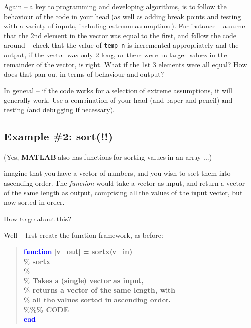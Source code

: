 \documentclass{tufte-book} %
\newenvironment{docspecbold}{\begin{quotation}\ttfamily\bfseries\parskip0pt\parindent0pt\ignorespaces}{\end{quotation}}
\begin{document}
Again -- a key to programming and developing algorithms, is to follow the behaviour of the code in your head (as well as adding break points and testing with a variety of inputs, including extreme assumptions). For instance -- assume that the 2nd element in the vector was equal to the first, and follow the code around -- check that the value of \texttt{temp\_n} is incremented appropriately and the output, if the vector was only 2 long, or there were no larger values in the remainder of the vector, is right. What if the 1st 3 elements were all equal? How does that pan out in terms of behaviour and output?

In general -- if the code works for a selection of extreme assumptions, it will generally work. Use a combination of your head (and paper and pencil) and testing (and debugging if necessary).


\subsection{Example \#2: sort(!!)}

(Yes, \textbf{MATLAB} also has functions for sorting values in an array ...)

\vspace{-2mm}
 imagine that you have a vector of numbers, and you wish to sort them into ascending order. The \textit{function} would take a vector as input, and return a vector of the same length as output, comprising all the values of the input vector, but now sorted in order.

How to go about this?

Well -- first create the function framework, as before:
\begin{docspecbold}
\textcolor{blue}{function} [v\_out] = sortx(v\_in)\\
\textcolor[rgb]{0,0.501961,0}{\% sortx\\
\%\\
\% Takes a (single) vector as input, \\ \% returns a vector of the same length, with \\ \% all the values sorted in ascending order.}\\
\textcolor[rgb]{0,0.501961,0}{\%\%\% CODE} \\
\textcolor{blue}{end}
\end{docspecbold}
\end{document}
